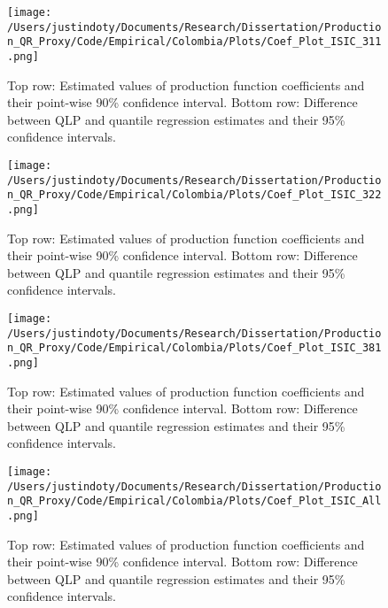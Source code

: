 \documentclass[11pt]{article}
\begin{document}
\begin{figure}[H]
\centering
\texttt{[image: /Users/justindoty/Documents/Research/Dissertation/Production\_QR\_Proxy/Code/Empirical/Colombia/Plots/Coef\_Plot\_ISIC\_311.png]}
\caption{Top row: Estimated values of production function coefficients and their point-wise 90\% confidence interval. Bottom row: Difference between QLP and quantile regression estimates and their 95\% confidence intervals.}
\label{fig:COL311}
\end{figure}

\begin{figure}[H]
\centering
\texttt{[image: /Users/justindoty/Documents/Research/Dissertation/Production\_QR\_Proxy/Code/Empirical/Colombia/Plots/Coef\_Plot\_ISIC\_322.png]}
\caption{Top row: Estimated values of production function coefficients and their point-wise 90\% confidence interval. Bottom row: Difference between QLP and quantile regression estimates and their 95\% confidence intervals.}
\label{fig:COL321}
\end{figure}

\begin{figure}[H]
\centering
\texttt{[image: /Users/justindoty/Documents/Research/Dissertation/Production\_QR\_Proxy/Code/Empirical/Colombia/Plots/Coef\_Plot\_ISIC\_381.png]}
\caption{Top row: Estimated values of production function coefficients and their point-wise 90\% confidence interval. Bottom row: Difference between QLP and quantile regression estimates and their 95\% confidence intervals.}
\label{fig:COL381}
\end{figure}

\begin{figure}[H]
\centering
\texttt{[image: /Users/justindoty/Documents/Research/Dissertation/Production\_QR\_Proxy/Code/Empirical/Colombia/Plots/Coef\_Plot\_ISIC\_All.png]}
\caption{Top row: Estimated values of production function coefficients and their point-wise 90\% confidence interval. Bottom row: Difference between QLP and quantile regression estimates and their 95\% confidence intervals.}
\label{fig:COLall}
\end{figure}


\end{document}
